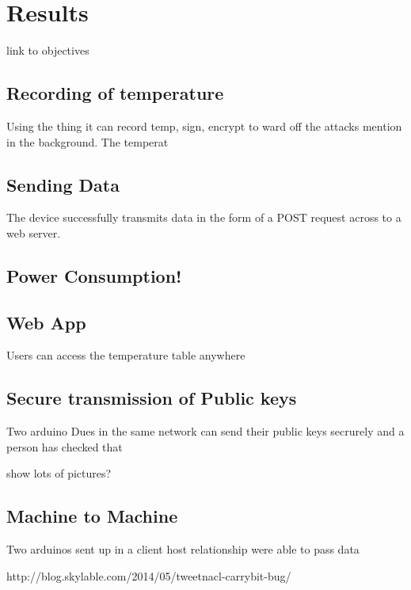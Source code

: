 \chapter{Results}
\label{res}

link to objectives

\section{Recording of temperature}

Using the thing it can record temp, sign, encrypt to ward off the attacks mention in the background. The temperat

\section{Sending Data}

The device successfully transmits data in the form of a POST request across to a web server.

\section{Power Consumption!}

\section{Web App}

Users can access the temperature table anywhere 

\section{Secure transmission of Public keys}

Two arduino Dues in the same network can send their public keys secrurely and a person has checked that

show lots of pictures?

\section{Machine to Machine}

Two arduinos sent up in a client host relationship were able to pass data

http://blog.skylable.com/2014/05/tweetnacl-carrybit-bug/
